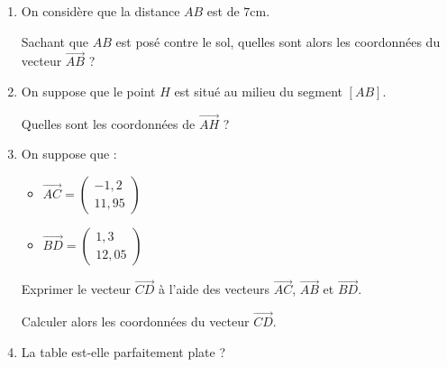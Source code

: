 \documentclass[
	classe=$2^{de}$,
	headerTitle=Activité
]{exercice}
\begin{document}
\begin{enumerate}
	\item On considère que la distance $AB$ est de $7$cm.

	      Sachant que $AB$ est posé contre le sol, quelles sont alors les coordonnées du vecteur $\vec{AB}$ ?
	\item On suppose que le point $H$ est situé au milieu du segment $[AB]$.

	      Quelles sont les coordonnées de $\vec{AH}$ ?

	\item On suppose que :
	      \begin{itemize}
		      \item $\vec{AC} = \begin{pmatrix}
				            -1,2 \\ 11,95
			            \end{pmatrix}$
		      \item $\vec{BD} = \begin{pmatrix}
				            1,3 \\ 12,05
			            \end{pmatrix}$
	      \end{itemize}
	      Exprimer le vecteur $\vec{CD}$ à l'aide des vecteurs $\vec{AC}$, $\vec{AB}$ et $\vec{BD}$.

	      Calculer alors les coordonnées du vecteur $\vec{CD}$.

	\item La table est-elle parfaitement plate ?
\end{enumerate}

\end{document}
